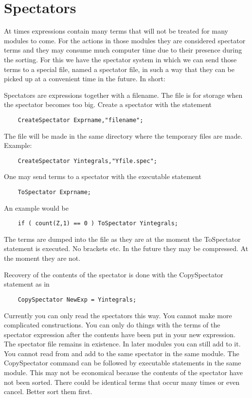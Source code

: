 
\chapter{Spectators}
\label{spectators}

At times expressions contain many terms that will not be treated for many 
modules to come. For the actions in those modules they are considered 
spectator terms and they may consume much computer time due to their 
presence during the sorting. For this we have the spectator system in which 
we can send those terms to a special file, named a spectator file, in such 
a way that they can be picked up at a convenient time in the future. In 
short:

\noindent
Spectators are expressions together with a filename. The 
file is for storage when the spectator becomes too big. Create a spectator 
with the statement
\begin{verbatim}
    CreateSpectator Exprname,"filename";
\end{verbatim}
The file will be made in the same directory where the temporary files are made. 
Example:
\begin{verbatim}
    CreateSpectator Yintegrals,"Yfile.spec";
\end{verbatim}
One may send terms to a spectator with the executable 
statement
\begin{verbatim}
    ToSpectator Exprname;
\end{verbatim}
An example would be
\begin{verbatim}
    if ( count(Z,1) == 0 ) ToSpectator Yintegrals;
\end{verbatim}
The terms are dumped into the file as they are at the moment the 
ToSpectator statement is executed. No brackets etc.
In the future they may be compressed. At the moment they are not.

Recovery of the contents of the spectator is done with the CopySpectator
statement as in
\begin{verbatim}
    CopySpectator NewExp = Yintegrals;
\end{verbatim}
Currently you can only read the spectators this way. You cannot make more 
complicated constructions. You can only do things with the terms of the 
spectator expression after the contents have been put in your new 
expression. The spectator file remains in existence. In later modules you 
can still add to it. You cannot read from and add to the same spectator in 
the same module. The CopySpectator command can be followed by executable 
statements in the same module. This may not be economical because the 
contents of the spectator have not been sorted. There could be identical 
terms that occur many times or even cancel. Better sort them first.

